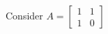 \documentclass[preview]{standalone}
\begin{document}
\begin{center}
Consider $A =  \begin{bmatrix} 1 & 1 \\ 1 & 0 \end{bmatrix}$
\end{center}
\end{document}
